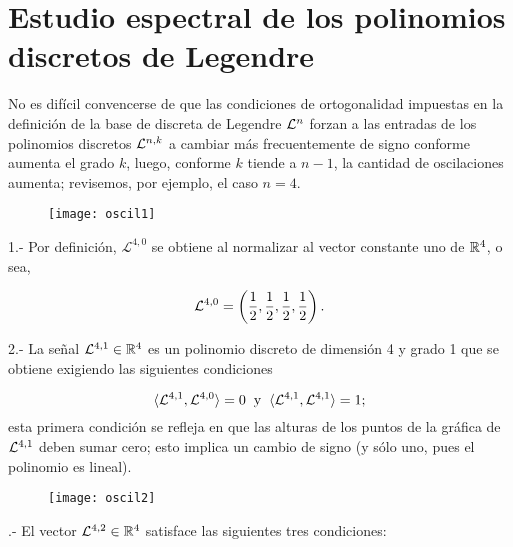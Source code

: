 \chapter{Estudio espectral de los polinomios discretos de Legendre}
\label{chap: estudio espectral}

No es difícil convencerse de que las condiciones de ortogonalidad
impuestas en la definición de la base de discreta de Legendre
$\mathcal{L}^{n}$
forzan a las entradas de los polinomios discretos $\mathcal{L}^{n,k}$
a cambiar más frecuentemente de signo conforme aumenta
el grado $k$, luego, conforme $k$ tiende a $n-1$,
la cantidad de oscilaciones aumenta; revisemos, 
por ejemplo, el caso $n=4$.



\begin{minipage}{0.5\textwidth}
\begin{figure}[H]
\texttt{[image: oscil1]}
\end{figure}
\end{minipage} \hfill
\begin{minipage}{0.45\textwidth}
1.- Por definición,
$\mathcal{L}^{4,0}$ se obtiene al normalizar 
al vector constante uno de $\mathbb{R}^{4}$, o sea, 

\[
\mathcal{L}^{4,0} = \left(
\frac{1}{2}, \frac{1}{2}, \frac{1}{2}, \frac{1}{2}
\right).
\]
\end{minipage} 


\begin{minipage}{0.5\textwidth}
2.- La señal $\mathcal{L}^{4,1} \in \mathbb{R}^{4}$ es un polinomio discreto de
dimensión 4 y grado 1 que se obtiene exigiendo las
siguientes condiciones

\[
\langle \mathcal{L}^{4,1} , \mathcal{L}^{4,0} \rangle=0
\hspace{0.2cm} \text{y} \hspace{0.2cm}
\langle \mathcal{L}^{4,1} , \mathcal{L}^{4,1} \rangle=1;
\]
esta primera condición se refleja en que 
las alturas de los puntos de la gráfica de 
$\mathcal{L}^{4,1}$ deben sumar cero;
esto implica un cambio de signo (y sólo uno,
pues el polinomio es lineal).

\end{minipage} \hfill
\begin{minipage}{0.45\textwidth}
\begin{figure}[H]
\texttt{[image: oscil2]}
\end{figure}
\end{minipage}

.- El vector
$\mathcal{L}^{4,2} \in \mathbb{R}^{4}$ satisface las siguientes
tres condiciones:

